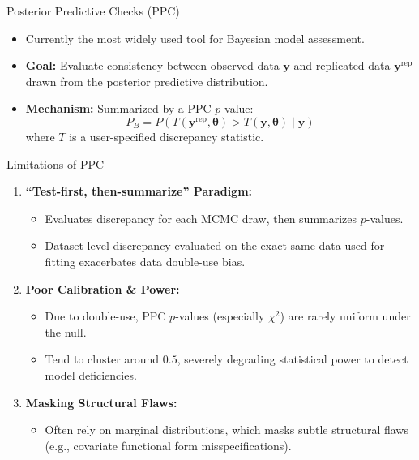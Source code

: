 \documentclass[
  ignorenonframetext,
]{beamer}
\providecommand{\tightlist}{%
  \setlength{\itemsep}{0pt}\setlength{\parskip}{0pt}}
\begin{document}
\begin{frame}{Posterior Predictive Checks (PPC)}
\protect{}\label{posterior-predictive-checks-ppc}
\begin{itemize}
\tightlist
\item
  Currently the most widely used tool for Bayesian model assessment.
\item
  \textbf{Goal:} Evaluate consistency between observed data
  \(\mathbf{y}\) and replicated data \(\mathbf{y}^{\text{rep}}\) drawn
  from the posterior predictive distribution.
\item
  \textbf{Mechanism:} Summarized by a PPC \(p\)-value:
  \[ P_B = P(T(\mathbf{y}^{\text{rep}}, \boldsymbol{\theta}) > T(\mathbf{y}, \boldsymbol{\theta}) \mid \mathbf{y}) \]
  where \(T\) is a user-specified discrepancy statistic.
\end{itemize}
\end{frame}

\begin{frame}{Limitations of PPC}
\protect{}\label{limitations-of-ppc}
\begin{enumerate}
\tightlist
\item
  \textbf{``Test-first, then-summarize'' Paradigm:}

  \begin{itemize}
  \tightlist
  \item
    Evaluates discrepancy for each MCMC draw, then summarizes
    \(p\)-values.
  \item
    Dataset-level discrepancy evaluated on the exact same data used for
    fitting exacerbates data double-use bias.
  \end{itemize}
\item
  \textbf{Poor Calibration \& Power:}

  \begin{itemize}
  \tightlist
  \item
    Due to double-use, PPC \(p\)-values (especially \(\chi^2\)) are
    rarely uniform under the null.
  \item
    Tend to cluster around \(0.5\), severely degrading statistical power
    to detect model deficiencies.
  \end{itemize}
\item
  \textbf{Masking Structural Flaws:}

  \begin{itemize}
  \tightlist
  \item
    Often rely on marginal distributions, which masks subtle structural
    flaws (e.g., covariate functional form misspecifications).
  \end{itemize}
\end{enumerate}
\end{frame}
\end{document}
